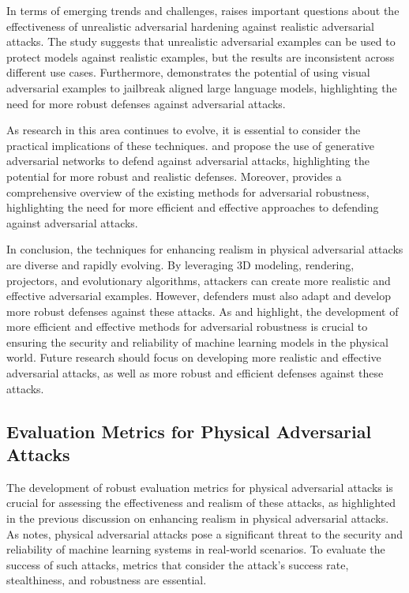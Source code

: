 \documentclass[11pt,a4paper]{article}
\begin{document}
In terms of emerging trends and challenges, \cite{doi:10.1109/sp46215.2023.10179316} raises important questions about the effectiveness of unrealistic adversarial hardening against realistic adversarial attacks. The study suggests that unrealistic adversarial examples can be used to protect models against realistic examples, but the results are inconsistent across different use cases. Furthermore, \cite{doi:10.1609/aaai.v38i19.30150} demonstrates the potential of using visual adversarial examples to jailbreak aligned large language models, highlighting the need for more robust defenses against adversarial attacks.

As research in this area continues to evolve, it is essential to consider the practical implications of these techniques. \cite{arxiv:1805.06605} and \cite{doi:10.1109/access.2022.3160283} propose the use of generative adversarial networks to defend against adversarial attacks, highlighting the potential for more robust and realistic defenses. Moreover, \cite{doi:10.1109/access.2022.3216291} provides a comprehensive overview of the existing methods for adversarial robustness, highlighting the need for more efficient and effective approaches to defending against adversarial attacks.

In conclusion, the techniques for enhancing realism in physical adversarial attacks are diverse and rapidly evolving. By leveraging 3D modeling, rendering, projectors, and evolutionary algorithms, attackers can create more realistic and effective adversarial examples. However, defenders must also adapt and develop more robust defenses against these attacks. As \cite{doi:10.1109/access.2022.3208131} and \cite{doi:10.1007/s10462-024-10841-z} highlight, the development of more efficient and effective methods for adversarial robustness is crucial to ensuring the security and reliability of machine learning models in the physical world. Future research should focus on developing more realistic and effective adversarial attacks, as well as more robust and efficient defenses against these attacks.


\subsection{Evaluation Metrics for Physical Adversarial Attacks}


The development of robust evaluation metrics for physical adversarial attacks is crucial for assessing the effectiveness and realism of these attacks, as highlighted in the previous discussion on enhancing realism in physical adversarial attacks. As \cite{doi:10.24963/ijcai.2021/694} notes, physical adversarial attacks pose a significant threat to the security and reliability of machine learning systems in real-world scenarios. To evaluate the success of such attacks, metrics that consider the attack's success rate, stealthiness, and robustness are essential. 
\end{document}
